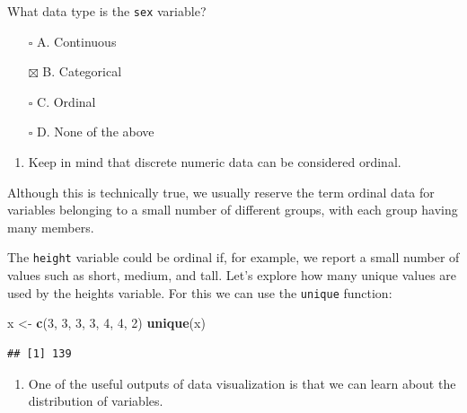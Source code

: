 \documentclass[
]{article}
\newenvironment{Shaded}{\begin{snugshade}}{\end{snugshade}}
\newcommand{\DecValTok}[1]{\textcolor[rgb]{0.00,0.00,0.81}{#1}}
\newcommand{\KeywordTok}[1]{\textcolor[rgb]{0.13,0.29,0.53}{\textbf{#1}}}
\newcommand{\NormalTok}[1]{#1}
\newcommand{\OperatorTok}[1]{\textcolor[rgb]{0.81,0.36,0.00}{\textbf{#1}}}
\newcommand{\StringTok}[1]{\textcolor[rgb]{0.31,0.60,0.02}{#1}}
\providecommand{\tightlist}{%
  \setlength{\itemsep}{0pt}\setlength{\parskip}{0pt}}
\begin{document}
What data type is the \texttt{sex} variable?

\begin{itemize}
\tightlist
\item[$\square$]
  A. Continuous
\item[$\boxtimes$]
  B. Categorical
\item[$\square$]
  C. Ordinal
\item[$\square$]
  D. None of the above
\end{itemize}

\begin{enumerate}
\def\labelenumi{\arabic{enumi}.}
\setcounter{enumi}{2}
\tightlist
\item
  Keep in mind that discrete numeric data can be considered ordinal.
\end{enumerate}

Although this is technically true, we usually reserve the term ordinal
data for variables belonging to a small number of different groups, with
each group having many members.

The \texttt{height} variable could be ordinal if, for example, we report
a small number of values such as short, medium, and tall. Let's explore
how many unique values are used by the heights variable. For this we can
use the \texttt{unique} function:

\begin{Shaded}
\begin{Highlighting}[]
\NormalTok{x <-}\StringTok{ }\KeywordTok{c}\NormalTok{(}\DecValTok{3}\NormalTok{, }\DecValTok{3}\NormalTok{, }\DecValTok{3}\NormalTok{, }\DecValTok{3}\NormalTok{, }\DecValTok{4}\NormalTok{, }\DecValTok{4}\NormalTok{, }\DecValTok{2}\NormalTok{)}
\KeywordTok{unique}\NormalTok{(x)}
\end{Highlighting}
\end{Shaded}

\begin{Shaded}
\end{Shaded}

\begin{verbatim}
## [1] 139
\end{verbatim}

\begin{enumerate}
\def\labelenumi{\arabic{enumi}.}
\setcounter{enumi}{3}
\tightlist
\item
  One of the useful outputs of data visualization is that we can learn
  about the distribution of variables.
\end{enumerate}
\end{document}
